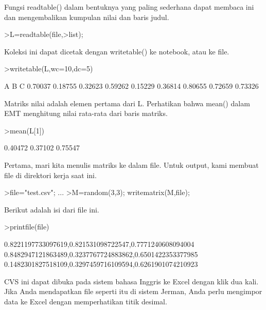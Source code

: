 \documentclass{article}
\begin{document}
\begin{eulernotebook}
\begin{eulercomment}
\begin{eulercomment}
\begin{euleroutput}
\end{euleroutput}
\begin{eulercomment}
Fungsi readtable() dalam bentuknya yang paling sederhana dapat membaca
ini dan mengembalikan kumpulan nilai dan baris judul.
\end{eulercomment}
\begin{eulerprompt}
>L=readtable(file,>list);
\end{eulerprompt}
\begin{eulercomment}
Koleksi ini dapat dicetak dengan writetable() ke notebook, atau ke
file.
\end{eulercomment}
\begin{eulerprompt}
>writetable(L,wc=10,dc=5)
\end{eulerprompt}
\begin{euleroutput}
           A         B         C
     0.70037   0.18755   0.32623
     0.59262   0.15229   0.36814
     0.80655   0.72659   0.73326
\end{euleroutput}
\begin{eulercomment}
Matriks nilai adalah elemen pertama dari L. Perhatikan bahwa mean()
dalam EMT menghitung nilai rata-rata dari baris matriks.
\end{eulercomment}
\begin{eulerprompt}
>mean(L[1])
\end{eulerprompt}
\begin{euleroutput}
    0.40472 
    0.37102 
    0.75547 
\end{euleroutput}
\begin{eulercomment}
Pertama, mari kita menulis matriks ke dalam file. Untuk output, kami membuat file di direktori kerja saat ini.
\end{eulercomment}
\begin{eulerprompt}
>file="test.csv";  ...
>M=random(3,3); writematrix(M,file);
\end{eulerprompt}
\begin{eulercomment}
Berikut adalah isi dari file ini.
\end{eulercomment}
\begin{eulerprompt}
>printfile(file)
\end{eulerprompt}
\begin{euleroutput}
  0.8221197733097619,0.821531098722547,0.7771240608094004
  0.8482947121863489,0.3237767724883862,0.6501422353377985
  0.1482301827518109,0.3297459716109594,0.6261901074210923
  
\end{euleroutput}
\begin{eulercomment}
CVS ini dapat dibuka pada sistem bahasa Inggris ke Excel dengan klik
dua kali. Jika Anda mendapatkan file seperti itu di sistem Jerman,
Anda perlu mengimpor data ke Excel dengan memperhatikan titik desimal.


\end{eulercomment}
\end{eulercomment}
\end{eulercomment}
\end{eulernotebook}
\end{document}

